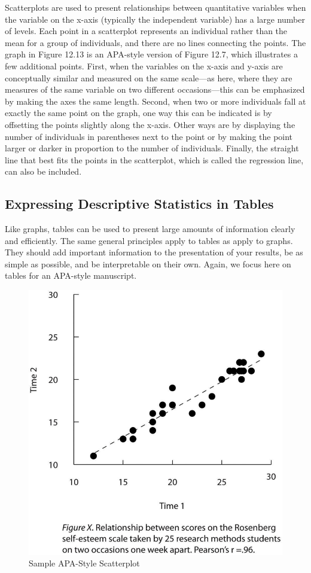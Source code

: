 Scatterplots are used to present relationships between quantitative variables when the variable on the x-axis (typically the independent variable) has a large number of levels. Each point in a scatterplot represents an individual rather than the mean for a group of individuals, and there are no lines connecting the points. The graph in Figure 12.13 is an APA-style version of Figure 12.7, which illustrates a few additional points. First, when the variables on the x-axis and y-axis are conceptually similar and measured on the same scale---as here, where they are measures of the same variable on two different occasions---this can be emphasized by making the axes the same length. Second, when two or more individuals fall at exactly the same point on the graph, one way this can be indicated is by offsetting the points slightly along the x-axis. Other ways are by displaying the number of individuals in parentheses next to the point or by making the point larger or darker in proportion to the number of individuals. Finally, the straight line that best fits the points in the scatterplot, which is called the regression line, can also be included.

\subsection{Expressing Descriptive Statistics in Tables}

Like graphs, tables can be used to present large amounts of information clearly and efficiently. The same general principles apply to tables as apply to graphs. They should add important information to the presentation of your results, be as simple as possible, and be interpretable on their own. Again, we focus here on tables for an APA-style manuscript.

\begin{figure}
\includegraphics[width=.7\linewidth]{figures/Fig12-13}
\caption{Sample APA-Style Scatterplot}
\label{fig:apascatter}
\end{figure}



